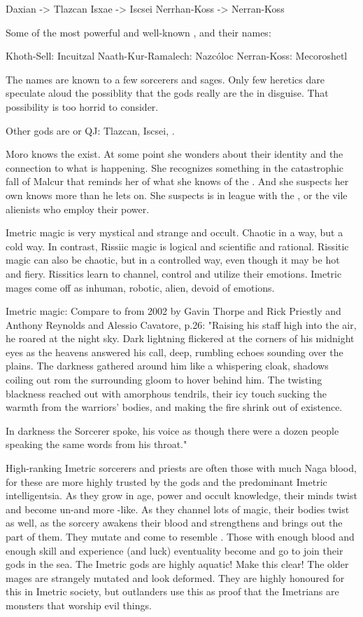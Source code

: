 Daxian -> Tlazcan
Isxae -> Iscsei
Nerrhan-Koss -> Nerran-Koss

Some of the most powerful and well-known \xs, and their \Ortaican names:

Khoth-Sell: Incuitzal
Naath-Kur-Ramalech: Nazcóloc
Nerran-Koss: Mecoroshetl

The \xs names are known to a few sorcerers and sages.
Only few heretics dare speculate aloud the possiblity that the \Ortaican gods really are the \xs in disguise.
That possibility is too horrid to consider.

Other \Ortaican gods are \dragons or QJ: Tlazcan, Iscsei, \Nasshikerr.

Moro \Cornel knows the \xs exist. 
At some point she wonders about their identity and the connection to what is happening.
She recognizes something in the catastrophic fall of Malcur that reminds her of what she knows of the \xs.
And she suspects her own \Nasshikerr knows more than he lets on. 
She suspects \Nasshikerr is in league with the \xs, or the vile alienists who employ their power.

Imetric magic is very mystical and strange and occult. Chaotic in a way, but a cold way.
In contrast, Rissiic magic is logical and scientific and rational.
Rissitic magic can also be chaotic, but in a controlled way, even though it may be hot and fiery.
Rissitics learn to channel, control and utilize their emotions.
Imetric mages come off as inhuman, robotic, alien, devoid of emotions.

Imetric magic: Compare to  from 2002 by Gavin Thorpe and Rick Priestly and Anthony Reynolds and Alessio Cavatore, p.26:
"Raising his staff high into the air, he roared at the night sky. 
Dark lightning flickered at the corners of his midnight eyes as the heavens answered his call, deep, rumbling echoes sounding over the plains.
The darkness gathered around him like a whispering cloak, shadows coiling out rom the surrounding gloom to hover behind him.
The twisting blackness reached out with amorphous tendrils, their icy touch sucking the warmth from the warriors' bodies, and making the fire shrink out of existence.

In darkness the Sorcerer spoke, his voice as though there were a dozen people speaking the same words from his throat."

High-ranking Imetric sorcerers and priests are often those with much Naga blood, for these are more highly trusted by the gods and the predominant Imetric intelligentsia.
As they grow in age, power and occult  knowledge, their minds twist and become un-\scathaese and more \naga-like. 
As they channel lots of magic, their bodies twist as well, as the \naga sorcery awakens their \naga blood and strengthens and brings out the \naga part of them. 
They mutate and come to resemble \nagae.
Those with enough \naga blood and enough skill and experience (and luck) eventuality become \nagae and go to join their gods in the sea.
The Imetric gods are highly aquatic! Make this clear!
The older mages are strangely mutated and look deformed.
They are highly honoured for this in Imetric society, but outlanders use this as proof that the Imetrians are monsters that worship evil things.

